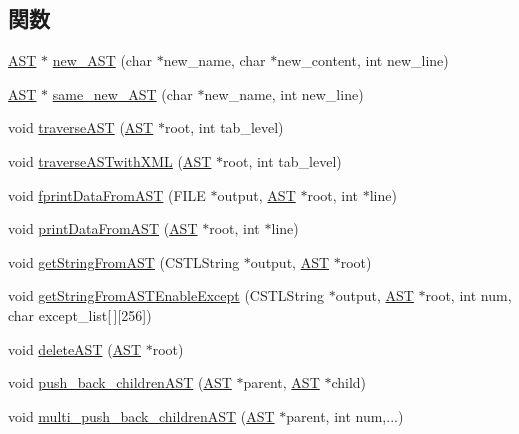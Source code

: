 \subsection*{関数}
\begin{DoxyCompactItemize}
\item 
\hyperlink{structabstract__syntax__tree}{AST} $\ast$ \hyperlink{AST_8h_a561ad4662c952c9f7f0e865718ae2ca1}{new\_\-AST} (char $\ast$new\_\-name, char $\ast$new\_\-content, int new\_\-line)
\item 
\hyperlink{structabstract__syntax__tree}{AST} $\ast$ \hyperlink{AST_8h_a385fcf61df654b7c648b0ed109b488e1}{same\_\-new\_\-AST} (char $\ast$new\_\-name, int new\_\-line)
\item 
void \hyperlink{AST_8h_a9ce8fa4ef1dfca0fbcd8fd838079d587}{traverseAST} (\hyperlink{structabstract__syntax__tree}{AST} $\ast$root, int tab\_\-level)
\item 
void \hyperlink{AST_8h_a0d03e6fef0765425ce87cf82c5bb8705}{traverseASTwithXML} (\hyperlink{structabstract__syntax__tree}{AST} $\ast$root, int tab\_\-level)
\item 
void \hyperlink{AST_8h_ae7e8f342424c16f107b1cb24696b1d9e}{fprintDataFromAST} (FILE $\ast$output, \hyperlink{structabstract__syntax__tree}{AST} $\ast$root, int $\ast$line)
\item 
void \hyperlink{AST_8h_a640626d7a64e560abcbb557302b82208}{printDataFromAST} (\hyperlink{structabstract__syntax__tree}{AST} $\ast$root, int $\ast$line)
\item 
void \hyperlink{AST_8h_a5b499afa940ee03cf6cb4f2d7564c00d}{getStringFromAST} (CSTLString $\ast$output, \hyperlink{structabstract__syntax__tree}{AST} $\ast$root)
\item 
void \hyperlink{AST_8h_a5e14306ec790d4583ffc3c610074de8d}{getStringFromASTEnableExcept} (CSTLString $\ast$output, \hyperlink{structabstract__syntax__tree}{AST} $\ast$root, int num, char except\_\-list\mbox{[}$\,$\mbox{]}\mbox{[}256\mbox{]})
\item 
void \hyperlink{AST_8h_a8c99cebbba801e86fcdf87e0e68b07a8}{deleteAST} (\hyperlink{structabstract__syntax__tree}{AST} $\ast$root)
\item 
void \hyperlink{AST_8h_a2ac04711eeafbb8805689cf2c992ea51}{push\_\-back\_\-childrenAST} (\hyperlink{structabstract__syntax__tree}{AST} $\ast$parent, \hyperlink{structabstract__syntax__tree}{AST} $\ast$child)
\item 
void \hyperlink{AST_8h_af7952c19c9294e653d47966f719ec2c0}{multi\_\-push\_\-back\_\-childrenAST} (\hyperlink{structabstract__syntax__tree}{AST} $\ast$parent, int num,...)

\end{DoxyCompactItemize}
